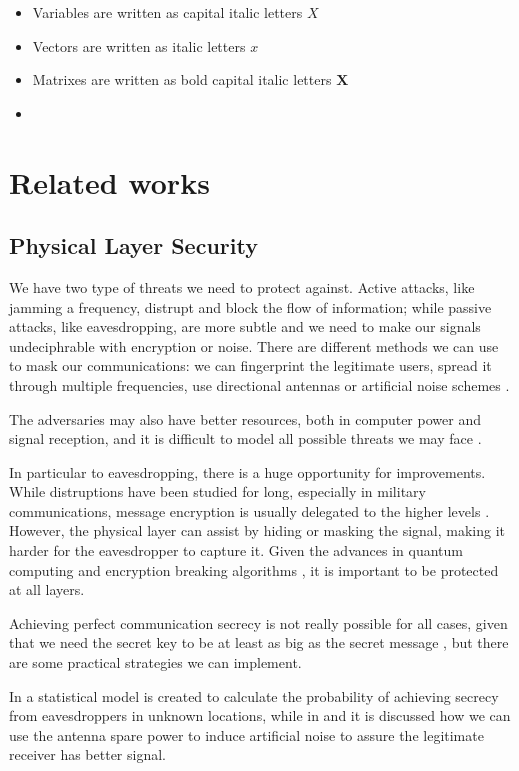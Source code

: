 \begin{itemize}
  \item Variables are written as capital italic letters $X$
  \item Vectors are written as italic letters $x$
  \item Matrixes are written as bold capital italic letters $\bm{X}$
  \item
\end{itemize}

\newpage
\section{Related works}
\subsection{Physical Layer Security}

We have two type of threats we need to protect against. Active attacks, like jamming a frequency, distrupt and block the flow of information; while passive attacks, like eavesdropping, are more subtle and we need to make our signals undeciphrable with encryption or noise. There are different methods we can use to mask our communications: we can fingerprint the legitimate users, spread it through multiple frequencies, use directional antennas or artificial noise schemes \cite{5751298}.

The adversaries may also have better resources, both in computer power and signal reception, and it is difficult to model all possible threats we may face \cite{7120011}.

In particular to eavesdropping, there is a huge opportunity for improvements. While distruptions have been studied for long, especially in military communications, message encryption is usually delegated to the higher levels \cite{6739367}. However, the physical layer can assist by hiding or masking the signal, making it harder for the eavesdropper to capture it. Given the advances in quantum computing and encryption breaking algorithms \cite{365700}, it is important to be protected at all layers.

Achieving perfect communication secrecy is not really possible for all cases, given that we need the secret key to be at least as big as the secret message \cite{6769090}, but there are some practical strategies we can implement.

In \cite{7543509} a statistical model is created to calculate the probability of achieving secrecy from eavesdroppers in unknown locations, while in \cite{4543070} and \cite{1605889} it is discussed how we can use the antenna spare power to induce artificial noise to assure the legitimate receiver has better signal.

